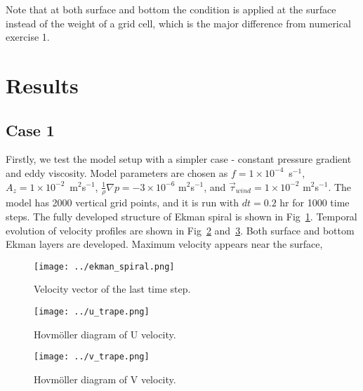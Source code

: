 \documentclass{article}
\begin{document}
Note that at both surface and bottom the condition is applied at the surface instead of the weight of a grid cell, which is the major difference from numerical exercise 1.\\

\section{Results}
\subsection{Case 1}
Firstly, we test the model setup with a simpler case - constant pressure gradient and eddy viscosity. Model parameters are chosen as $f=1\times10^{-4}$~s$^{-1}$, $A_z=1\times10^{-2}$~m$^2$s$^{-1}$, $\frac{1}{\rho}\nabla p=-3\times10^{-6}$ m$^2$s$^{-1}$, and $\vec{\tau}_{wind}=1\times10^{-2}$ m$^2$s$^{-1}$. The model has 2000 vertical grid points, and it is run with $dt=0.2$ hr for 1000 time steps. The fully developed structure of Ekman spiral is shown in Fig~\ref{fig:spiral}. Temporal evolution of velocity profiles are shown in Fig~\ref{fig:u} and~\ref{fig:v}. Both surface and bottom Ekman layers are developed. Maximum velocity appears near the surface,

\begin{figure}
  \centerline{\texttt{[image: ../ekman\_spiral.png]}}
  \caption{Velocity vector of the last time step.}
  \label{fig:spiral}
\end{figure}

\begin{figure}
  \centerline{\texttt{[image: ../u\_trape.png]}}
  \caption{Hovm\"{o}ller diagram of U velocity.}
  \label{fig:u}
\end{figure}

\begin{figure}
  \centerline{\texttt{[image: ../v\_trape.png]}}
  \caption{Hovm\"{o}ller diagram of V velocity.}
  \label{fig:v}
\end{figure}


\clearpage


\end{document}

